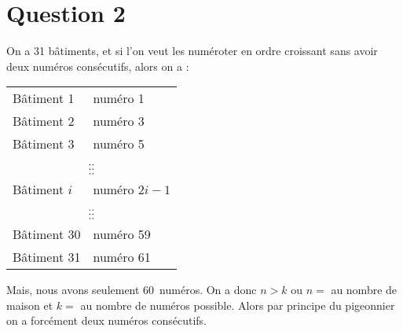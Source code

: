 \newpage
\section*{Question 2}
On a 31 bâtiments, et si l’on veut les numéroter en ordre croissant sans avoir deux numéros consécutifs, alors on a :

\begin{center}
	\begin{tabular}{l@{ $\rightarrow$ }l}
		 Bâtiment 1  & numéro 1                                          \\
		 Bâtiment 2  & numéro 3                                          \\
		 Bâtiment 3  & numéro 5                                          \\
		\multicolumn{2}{c}{$\hfill\vdots\hfill\hfill\hfill\vdots\hfill\hfill$} \\
		Bâtiment $i$ & numéro $2 i - 1$                                  \\
		\multicolumn{2}{c}{$\hfill\vdots\hfill\hfill\hfill\vdots\hfill\hfill$} \\
		Bâtiment 30  & numéro 59                                         \\
		Bâtiment 31  & numéro 61
	\end{tabular}
	\end{center}

Mais, nous avons seulement 60~numéros. On a donc $n > k$ ou $n = $ au nombre de maison et $k = $ au nombre de numéros possible. Alors par principe du pigeonnier on a forcément deux numéros consécutifs.